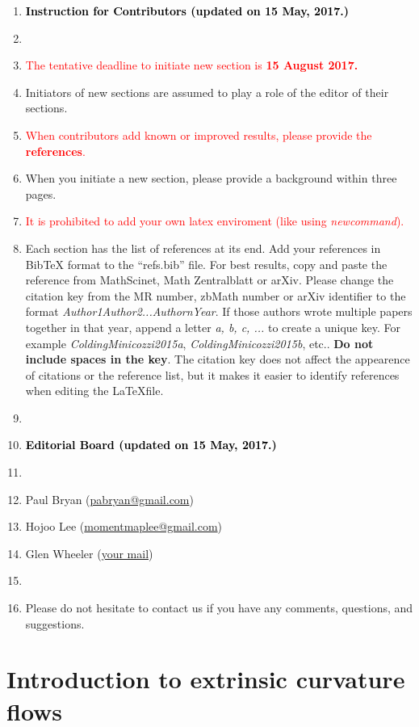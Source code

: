 \documentclass{amsart}
\theoremstyle{definition}
\begin{document}
\begin{enumerate}
\item[] \textbf{\textcolor{black}{Instruction for Contributors (updated on 15 May, 2017.)}}
\item[]
\item {\textcolor{red}{The tentative deadline to initiate new section is \textbf{15 August 2017.}}}
\item Initiators of new sections are assumed to play a role of the editor of their sections.
\item \textcolor{red}{When contributors add known or improved results, please provide the \textbf{references}.} 
\item When you initiate a new section, please provide a background within three pages. 
\item  {\textcolor{red}{It is prohibited to add your own latex enviroment (like using \textit{newcommand}).}} 
\item Each section has the list of references at its end. Add your references in BibTeX format to the ``refs.bib'' file. For best results, copy and paste the reference from MathScinet, Math Zentralblatt or arXiv. Please change the citation key from the MR number, zbMath number or arXiv identifier to the format \emph{Author1Author2...AuthornYear}. If those authors wrote multiple papers together in that year, append a letter \emph{a, b, c, ...} to create a unique key. For example \emph{ColdingMinicozzi2015a}, \emph{ColdingMinicozzi2015b}, etc.. \textbf{Do not include spaces in the key}. The citation key does not affect the appearence of citations or the reference list, but it makes it easier to identify references when editing the \LaTeX file.
\item[]
\item[] \textbf{\textcolor{black}{Editorial Board (updated on 15 May, 2017.)}}
\item[]
\item[] Paul Bryan  (\href{mailto:pabryan@gmail.com}{pabryan@gmail.com}) 
\item[] Hojoo Lee  (\href{mailto:momentmaplee@gmail.com}{momentmaplee@gmail.com}) 
\item[] Glen Wheeler  (\href{your mail}{your mail}) 
\item[]
\item[] Please do not hesitate to contact us if you have any comments, questions, and suggestions. 
\end{enumerate}

\section{Introduction to extrinsic curvature flows}
  
\end{document}
